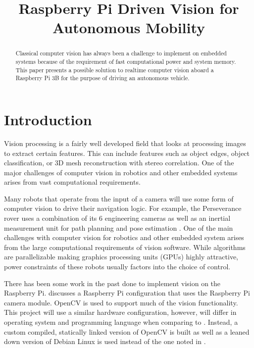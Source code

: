 \documentclass{article}
\title{Raspberry Pi Driven Vision for Autonomous Mobility}
\begin{document}
\maketitle

\begin{abstract}
Classical computer vision has always been a challenge to implement on embedded systems because of the requirement of fast computational power and system memory. This paper presents a possible solution to realtime computer vision aboard a Raspberry Pi 3B for the purpose of driving an autonomous vehicle.
\end{abstract}

\section{Introduction}

Vision processing is a fairly well developed field that looks at processing images to extract certain features. This can include features such as object edges, object classification, or 3D mesh reconstruction with stereo correlation. One of the major challenges of computer vision in robotics and other embedded systems arises from vast computational requirements.

Many robots that operate from the input of a camera will use some form of computer vision to drive their navigation logic. For example, the Perseverance rover uses a combination of its 6 engineering cameras as well as an inertial measurement unit for path planning and pose estimation \cite{b1}. One of the main challenges with computer vision for robotics and other embedded system arises from the large computational requirements of vision software. While algorithms are parallelizable making graphics processing units (GPUs) highly attractive, power constraints of these robots usually factors into the choice of control.

There has been some work in the past done to implement vision on the Raspberry Pi. \cite{b3} discusses a Raspberry Pi configuration that uses the Raspberry Pi camera module. OpenCV is used to support much of the vision functionality. This project will use a similar hardware configuration, however, will differ in operating system and programming language when comparing to \cite{b3}. Instead, a custom compiled, statically linked version of OpenCV is built as well as a leaned down version of Debian Linux is used instead of the one noted in \cite{b3}.
\end{document}
